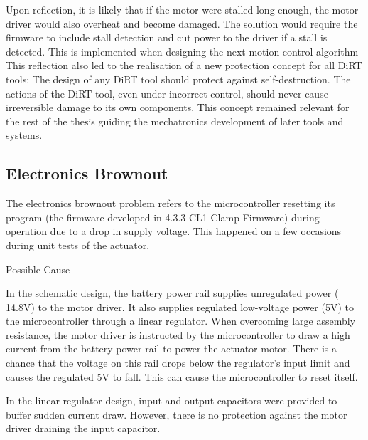 Upon reflection, it is likely that if the motor were stalled long enough, the motor driver would also overheat and become damaged. The solution would require the firmware to include stall detection and cut power to the driver if a stall is detected. This is implemented when designing the next motion control algorithm 
This reflection also led to the realisation of a new protection concept for all DiRT tools: The design of any DiRT tool should protect against self-destruction. The actions of the DiRT tool, even under incorrect control, should never cause irreversible damage to its own components. This concept remained relevant for the rest of the thesis guiding the mechatronics development of later tools and systems.

\subsection{Electronics Brownout}
\label{subsection:exploration_1_electronics_brownout}

The electronics brownout problem refers to the microcontroller resetting its program (the firmware developed in 4.3.3 CL1 Clamp Firmware) during operation due to a drop in supply voltage. This happened on a few occasions during unit tests of the actuator.

Possible Cause

In the schematic design, the battery power rail supplies unregulated power (~ 14.8V) to the motor driver. It also supplies regulated low-voltage power (5V) to the microcontroller through a linear regulator. When overcoming large assembly resistance, the motor driver is instructed by the microcontroller to draw a high current from the battery power rail to power the actuator motor. There is a chance that the voltage on this rail drops below the regulator’s input limit and causes the regulated 5V to fall. This can cause the microcontroller to reset itself.

In the linear regulator design, input and output capacitors were provided to buffer sudden current draw. However, there is no protection against the motor driver draining the input capacitor.

